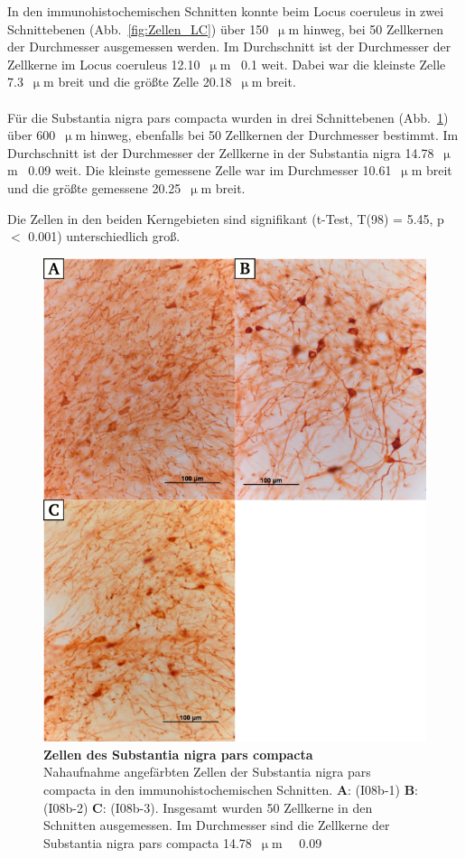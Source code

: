 \documentclass[12pt,a4paper,pdftex]{article}
\newcommand{\rpm}{\raisebox{.2ex}{$\scriptstyle\pm$} }
\begin{document}
In den immunohistochemischen Schnitten konnte beim Locus coeruleus  in zwei Schnittebenen (Abb.~\ref{fig:Zellen_LC}) über 150~$\upmu$m hinweg, bei 50 Zellkernen der Durchmesser ausgemessen werden. Im Durchschnitt ist der Durchmesser der Zellkerne im Locus coeruleus 12.10~$\upmu$m~\rpm0.1 weit. Dabei war die kleinste Zelle 7.3~$\upmu$m breit und die größte Zelle 20.18~$\upmu$m breit.
\\
\\
Für die Substantia nigra pars compacta  wurden in drei Schnittebenen (Abb.~\ref{fig:Zellen_SNC}) über 600~$\upmu$m hinweg, ebenfalls bei 50 Zellkernen der Durchmesser bestimmt. Im Durchschnitt ist der Durchmesser der Zellkerne in der Substantia nigra 14.78~$\upmu$m~\rpm0.09 weit. Die kleinste gemessene Zelle war im Durchmesser 10.61~$\upmu$m breit und die größte gemessene 20.25~$\upmu$m breit.

Die Zellen in den beiden Kerngebieten sind signifikant (t-Test, T(98) = 5.45, p $<$ 0.001) unterschiedlich groß.

\begin{figure}[H]
    \centering
    \includegraphics{pictures/Bilder_monoamine_systeme/Zellen_SNC.png}
    \caption[Zellen des Substantia nigra pars compacta]{\textbf{Zellen des Substantia nigra pars compacta}\\
    Nahaufnahme angefärbten Zellen der Substantia nigra pars compacta in den immunohistochemischen Schnitten. \textbf{A}: (I08b-1) \textbf{B}: (I08b-2) \textbf{C}: (I08b-3). Insgesamt wurden 50 Zellkerne in den Schnitten ausgemessen. Im Durchmesser sind die Zellkerne der Substantia nigra pars compacta 14.78~$\upmu$m~\rpm~0.09}
    \label{fig:Zellen_SNC}
\end{figure}
\end{document}
